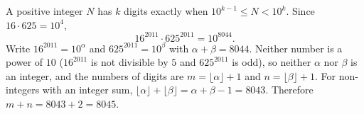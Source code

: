 A positive integer $N$ has $k$ digits exactly when $10^{k-1}\le N<10^k$. Since $16\cdot625=10^4$,
\[
16^{2011}\cdot625^{2011}=10^{8044}.
\]
Write $16^{2011}=10^{\alpha}$ and $625^{2011}=10^{\beta}$ with $\alpha+\beta=8044$. Neither number is a power of $10$ ($16^{2011}$ is not divisible by $5$ and $625^{2011}$ is odd), so neither $\alpha$ nor $\beta$ is an integer, and the numbers of digits are $m=\lfloor\alpha\rfloor+1$ and $n=\lfloor\beta\rfloor+1$. For non-integers with an integer sum, $\lfloor\alpha\rfloor+\lfloor\beta\rfloor=\alpha+\beta-1=8043$. Therefore $m+n=8043+2=\boxed{8045}$.

